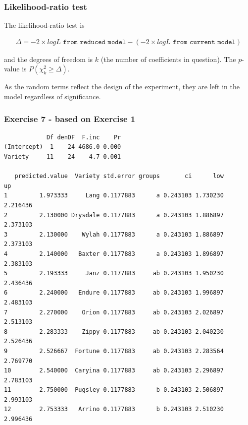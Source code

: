\begin{frame}\frametitle{Likelihood-ratio test}
The likelihood-ratio test is

\begin{eqnarray*}
\Delta = -2 \times logL \texttt{ from reduced model} - (-2 \times logL \texttt{ from current model})
\end{eqnarray*}


and the degrees of freedom is $k$ (the number of coefficients in question). The $p$-value is $P(\chi^2_k \geq \Delta)$.

As the random terms reflect the design of the experiment, they are left in the model regardless of significance.


\end{frame}


\begin{frame}[fragile]\frametitle{Exercise 7 - based on Exercise 1}
\begin{verbatim}
            Df denDF  F.inc    Pr
(Intercept)  1    24 4686.0 0.000
Variety     11    24    4.7 0.001

   predicted.value  Variety std.error groups       ci      low       up
1         1.973333     Lang 0.1177883      a 0.243103 1.730230 2.216436
2         2.130000 Drysdale 0.1177883      a 0.243103 1.886897 2.373103
3         2.130000    Wylah 0.1177883      a 0.243103 1.886897 2.373103
4         2.140000   Baxter 0.1177883      a 0.243103 1.896897 2.383103
5         2.193333     Janz 0.1177883     ab 0.243103 1.950230 2.436436
6         2.240000   Endure 0.1177883     ab 0.243103 1.996897 2.483103
7         2.270000    Orion 0.1177883     ab 0.243103 2.026897 2.513103
8         2.283333    Zippy 0.1177883     ab 0.243103 2.040230 2.526436
9         2.526667  Fortune 0.1177883     ab 0.243103 2.283564 2.769770
10        2.540000  Caryina 0.1177883     ab 0.243103 2.296897 2.783103
11        2.750000  Pugsley 0.1177883      b 0.243103 2.506897 2.993103
12        2.753333   Arrino 0.1177883      b 0.243103 2.510230 2.996436
\end{verbatim}
\end{frame}

